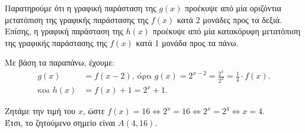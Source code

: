 \begin{alist}
\item Παρατηρούμε ότι η γραφική παράσταση της $g(x)$ προέκυψε από μία οριζόντια μετατόπιση της γραφικής παράστασης της $f(x)$ κατά 2 μονάδες προς τα δεξιά. \\
Επίσης, η γραφική παράσταση της $h(x)$ προέκυψε από μία κατακόρυφη μετατόπιση της γραφικής παράστασης της $f(x)$ κατά 1 μονάδα προς τα πάνω.
\item Με βάση τα παραπάνω, έχουμε:
\begin{align*}
g(x) &= f(x - 2)\text{, άρα } g(x) = 2^{x - 2} = \frac{2^x}{2^2} = \frac{1}{4} \cdot f(x). \\
\text{και } h(x) &= f(x) + 1 = 2^x + 1.
\end{align*}
\item Ζητάμε την τιμή του $x$, ώστε $f(x) = 16 \Leftrightarrow 2^x = 16 \Leftrightarrow 2^x = 2^4 \Leftrightarrow x = 4$. \\
Έτσι, το ζητούμενο σημείο είναι $A(4,16)$.
\begin{center}
\end{center}
\end{alist}

